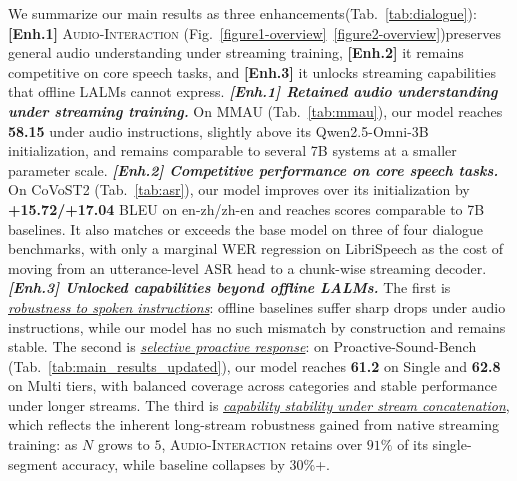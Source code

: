 \documentclass{article}
\begin{document}
We summarize our main results as three enhancements(Tab.~\ref{tab:dialogue}): \textbf{[Enh.1]}  \textsc{Audio-Interaction} (Fig.~\ref{figure1-overview}~\ref{figure2-overview})preserves general audio understanding under streaming training, \textbf{[Enh.2]} it remains competitive on core speech tasks, and \textbf{[Enh.3]} it unlocks streaming capabilities that offline LALMs cannot express.
\textit{\textbf{[Enh.1] Retained audio understanding under streaming training.}} On MMAU (Tab.~\ref{tab:mmau}), our model reaches \textbf{58.15} under audio instructions, slightly above its Qwen2.5-Omni-3B initialization, and remains comparable to several 7B systems at a smaller parameter scale.
\textit{\textbf{[Enh.2] Competitive performance on core speech tasks.}} On CoVoST2 (Tab.~\ref{tab:asr}), our model improves over its initialization by \textbf{+15.72/+17.04} BLEU on en-zh/zh-en and reaches scores comparable to 7B baselines. It also matches or exceeds the base model on three of four dialogue benchmarks, with only a marginal WER regression on LibriSpeech as the cost of moving from an utterance-level ASR head to a chunk-wise streaming decoder.
\textit{\textbf{[Enh.3] Unlocked capabilities beyond offline LALMs.}} The first is \underline{\textit{robustness to spoken instructions}}: offline baselines suffer sharp drops under audio instructions, while our model has no such mismatch by construction and remains stable. The second is \underline{\textit{selective proactive response}}: on Proactive-Sound-Bench (Tab.~\ref{tab:main_results_updated}), our model reaches \textbf{61.2} on Single and \textbf{62.8} on Multi tiers, with balanced coverage across categories and stable performance under longer streams. The third is \underline{\textit{capability stability under stream concatenation}}, which reflects the inherent long-stream robustness gained from native streaming training: as $N$ grows to $5$, \textsc{Audio-Interaction} retains over $91\%$ of its single-segment accuracy, while baseline collapses by $30\%$+.
\end{document}
